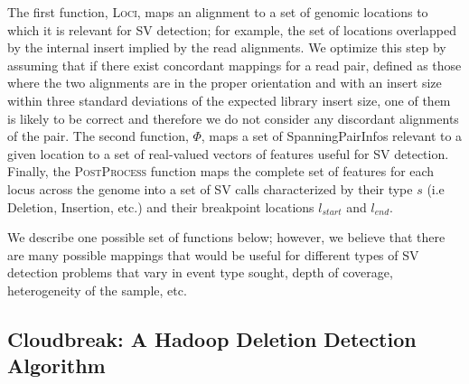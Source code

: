 \documentclass[11pt]{article}
\begin{document}
The first function, \textsc{Loci}, maps an alignment to a set of genomic locations to which it is relevant for SV detection; for example, the set of locations overlapped by the internal insert implied by the read alignments. We optimize this step by assuming that if there exist concordant mappings for a read pair, defined as those where the two alignments are in the proper orientation and with an insert size within three standard deviations of the expected library insert size, one of them is likely to be correct and therefore we do not consider any discordant alignments of the pair. The second function, $\Phi$, maps a set of SpanningPairInfos relevant to a given location to a set of real-valued vectors of features useful for SV detection. Finally, the \textsc{PostProcess} function maps the complete set of features for each locus across the genome into a set of SV calls characterized by their type $s$ (i.e Deletion, Insertion, etc.) and their breakpoint locations $l_{start}$ and $l_{end}$.

We describe one possible set of functions below; however, we believe that there are many possible mappings that would be useful for different types of SV detection problems that vary in event type sought, depth of coverage, heterogeneity of the sample, etc.

\subsection{Cloudbreak: A Hadoop Deletion Detection Algorithm}
\end{document}
